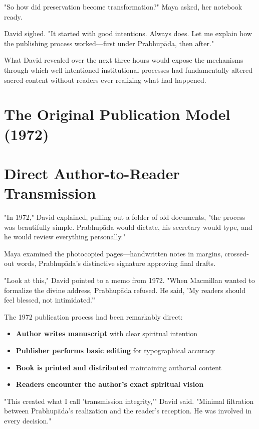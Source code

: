 \documentclass[11pt,twoside]{book}
\begin{document}
"So how did preservation become transformation?" Maya asked, her notebook ready.

David sighed. "It started with good intentions. Always does. Let me explain how the publishing process worked—first under Prabhupāda, then after."

What David revealed over the next three hours would expose the mechanisms through which well-intentioned institutional processes had fundamentally altered sacred content without readers ever realizing what had happened.
\section*{The Original Publication Model (1972)}
\label{sec:orgab6c077}

\section*{Direct Author-to-Reader Transmission}
\label{sec:org7555e1e}

"In 1972," David explained, pulling out a folder of old documents, "the process was beautifully simple. Prabhupāda would dictate, his secretary would type, and he would review everything personally."

Maya examined the photocopied pages—handwritten notes in margins, crossed-out words, Prabhupāda's distinctive signature approving final drafts.

"Look at this," David pointed to a memo from 1972. "When Macmillan wanted to formalize the divine address, Prabhupāda refused. He said, 'My readers should feel blessed, not intimidated.'"

The 1972 publication process had been remarkably direct:
\begin{itemize}
\item \textbf{\textbf{Author writes manuscript}} with clear spiritual intention
\item \textbf{\textbf{Publisher performs basic editing}} for typographical accuracy
\item \textbf{\textbf{Book is printed and distributed}} maintaining authorial content
\item \textbf{\textbf{Readers encounter the author's exact spiritual vision}}
\end{itemize}

"This created what I call 'transmission integrity,'" David said. "Minimal filtration between Prabhupāda's realization and the reader's reception. He was involved in every decision."
\end{document}

